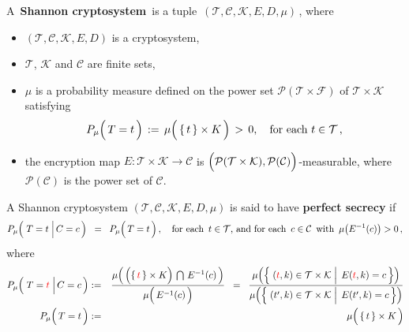 \begin{definition}
\mbox{}
\vskip 0.1cm
\noindent
A \,\textbf{Shannon cryptosystem}\, is a tuple \,$(\mathcal{T},\mathcal{C},\mathcal{K},E,D,\mu)$\,,
where
\begin{itemize}
\item
	$(\mathcal{T},\mathcal{C},\mathcal{K},E,D)$ is a cryptosystem,
\item
	$\mathcal{T}$, $\mathcal{K}$ and $\mathcal{C}$ are finite sets,
\item
	$\mu$ is a probability measure defined on the power set $\mathcal{P}(\mathcal{T}\times\mathcal{F})$
	of $\mathcal{T}\times\mathcal{K}$ satisfying
	\begin{equation*}
	P_{\mu}\!\left(\,\overset{{\color{white}.}}{T} = t\,\right)
	\, := \,\mu\!\left(\, \{\,t\,\} \overset{{\color{white}.}}{\times} K \,\right)
	\, > \, 0,
	\quad
	\textnormal{for each $t \in \mathcal{T}$}\,,
	\end{equation*}
\item
	the encryption map $E : \mathcal{T} \times \mathcal{K} \longrightarrow \mathcal{C}$ is
	$\left(
	\overset{{\color{white}.}}{\mathcal{P}}(\mathcal{T}\times\mathcal{K}),\mathcal{P}(\mathcal{C})
	\right)$-measurable, where $\mathcal{P}(\mathcal{C})$ is the power set of $\mathcal{C}$.
\end{itemize}
\end{definition}

\begin{definition}
\mbox{}
\vskip 0.1cm
\noindent
A Shannon cryptosystem
$(\mathcal{T},\mathcal{C},\mathcal{K},E,D,\mu)$
is said to have \textbf{perfect secrecy} if
\begin{equation*}
P_{\mu}\!\left(\,\left.\overset{{\color{white}.}}{T} = t \;\right\vert C = c\,\right)
\;\; = \;\;
	P_{\mu}\!\left(\,\overset{{\color{white}.}}{T} = t\,\right),
\quad
\textnormal{for each \,$t \in \mathcal{T}$, and for each \,$c \in \mathcal{C}$\, with \,$\mu\!\left(E^{-1}(c)\right) > 0$}\,,
\end{equation*}
where
\begin{eqnarray*}
P_{\mu}\!\left(\,\left.\overset{{\color{white}.}}{T} = {\color{red}t} \;\right\vert C = c\,\right)
& := &
	\dfrac{
		\mu\!\left(\,
			\left(\{\,{\color{red}t}\,\} \overset{{\color{white}.}}{\times} K\right) \,\bigcap\, E^{-1}(c)
			\,\right)
		}{
		\mu\!\left(\, \overset{{\color{white}.}}{E^{-1}}(c) \,\right)
		}
\;\; = \;\;
	\dfrac{
		\mu\!\left(\left\{\,
			\left.
			(\overset{{\color{white}.}}{{\color{red}t}},k) \in \mathcal{T} \times \mathcal{K}
			\;\right\vert\;
			E({\color{red}t},k) = c
			\,\right\}\right)
		}{
		\mu\!\left(\left\{\,
			\left.
			(\overset{{\color{white}.}}{t^{\prime}},k) \in \mathcal{T} \times \mathcal{K}
			\;\right\vert\;
			E(t^{\prime},k) = c
			\,\right\}\right)
		}
\\
P_{\mu}\!\left(\,\overset{{\color{white}.}}{T} = t\,\right)
& := &
	\mu\!\left(\, \{\,t\,\} \overset{{\color{white}.}}{\times} K \,\right)
\end{eqnarray*}
\end{definition}

